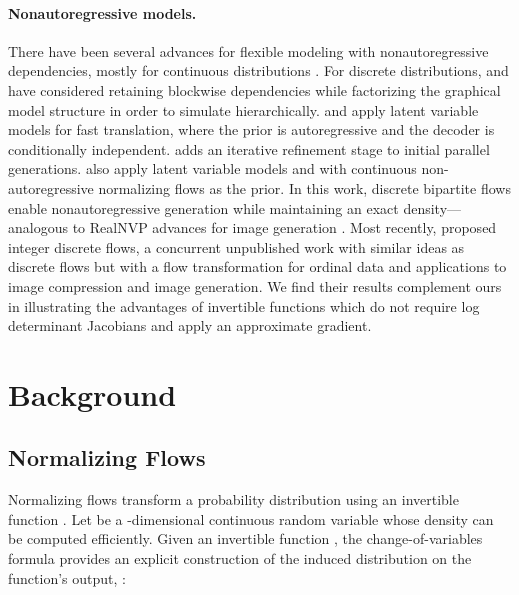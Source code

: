 \documentclass{article}
\begin{document}
\paragraph{Nonautoregressive models.}
There have been several advances for flexible modeling with nonautoregressive dependencies, mostly for continuous distributions \citep{dinh2014nice,dinh2017density,kingma2018glow}. For discrete distributions, \citet{reed2017parallel} and \citet{stern2018blockwise} have considered retaining blockwise dependencies while factorizing the graphical model structure in order to simulate hierarchically. \citet{gu2018non} and \citet{kaiser2018fast} apply latent variable models for fast translation, where the prior is autoregressive and the decoder is conditionally independent. \citet{lee2018deterministic} adds an iterative refinement stage to initial parallel generations.
\citet{ziegler2019latent} also apply latent variable models and with continuous non-autoregressive normalizing flows as the prior.
In this work, discrete bipartite flows enable nonautoregressive generation while maintaining an exact density---analogous to RealNVP advances for image generation \citep{dinh2017density}.
Most recently, \citet{hoogeboom2019integer} proposed integer discrete flows, a concurrent unpublished work with similar ideas as discrete flows but with a flow transformation for ordinal data and applications to image compression and image generation. We find their results complement ours in illustrating the advantages of invertible functions which do not require log determinant Jacobians and apply an approximate gradient.


\vspace{-1ex}
\section{Background}
\label{sec:background}

\subsection{Normalizing Flows}

Normalizing flows transform a probability distribution using an invertible function
\citep{tabak2013family,rezende2015variational,rippel2013high}. Let  be a -dimensional continuous random variable whose density can be computed efficiently. Given an invertible function , the change-of-variables formula provides an explicit construction of the induced distribution on the function's output, :
\end{document}
